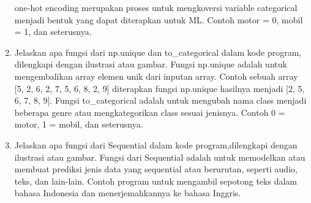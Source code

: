\begin{enumerate}
	\hfill\break
	one-hot encoding merupakan proses untuk mengkoversi variable categorical menjadi bentuk yang dapat diterapkan untuk ML. Contoh motor = 0, mobil = 1, dan seterusnya.
	\item Jelaskan apa fungsi dari np.unique dan to\_categorical dalam kode program, dilengkapi dengan ilustrasi atau gambar.
	\hfill\break
	Fungsi np.unique adalah untuk mengembalikan array elemen unik dari inputan array. Contoh sebuah array [5, 2, 6, 2, 7, 5, 6, 8, 2, 9] diterapkan fungsi np.unique hasilnya menjadi [2, 5, 6, 7, 8, 9].
	Fungsi to\_categorical adalah untuk mengubah nama class menjadi beberapa genre atau mengkategorikan class sesuai jenisnya. Contoh 0 = motor, 1 = mobil, dan seterusnya.
	\item Jelaskan apa fungsi dari Sequential dalam kode program,dilengkapi dengan ilustrasi atau gambar.
	\hfill\break
	Fungsi dari Sequential adalah untuk memodelkan atau membuat prediksi jenis data yang sequential atau berurutan, seperti audio, teks, dan lain-lain. Contoh program untuk mengambil sepotong teks dalam bahasa Indonesia dan menerjemahkannya ke bahasa Inggris.
\end{enumerate}

